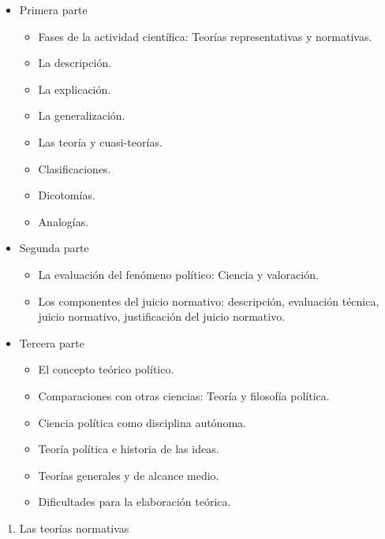 \documentclass[
]{book}
\providecommand{\tightlist}{%
  \setlength{\itemsep}{0pt}\setlength{\parskip}{0pt}}
\begin{document}
\begin{itemize}
\tightlist
\item
  Primera parte

  \begin{itemize}
  \tightlist
  \item
    Fases de la actividad científica: Teorías representativas y normativas.
  \item
    La descripción.
  \item
    La explicación.
  \item
    La generalización.
  \item
    Las teoría y cuasi-teorías.
  \item
    Clasificaciones.
  \item
    Dicotomías.
  \item
    Analogías.
  \end{itemize}
\item
  Segunda parte

  \begin{itemize}
  \tightlist
  \item
    La evaluación del fenómeno político: Ciencia y valoración.
  \item
    Los componentes del juicio normativo: descripción, evaluación técnica, juicio normativo, justificación del juicio normativo.
  \end{itemize}
\item
  Tercera parte

  \begin{itemize}
  \tightlist
  \item
    El concepto teórico político.
  \item
    Comparaciones con otras ciencias: Teoría y filosofía política.
  \item
    Ciencia política como disciplina autónoma.
  \item
    Teoría política e historia de las ideas.
  \item
    Teorías generales y de alcance medio.
  \item
    Dificultades para la elaboración teórica.
  \end{itemize}
\end{itemize}

\begin{enumerate}
\def\labelenumi{\arabic{enumi}.}
\setcounter{enumi}{2}
\tightlist
\item
  Las teorías normativas
\end{enumerate}
\end{document}
